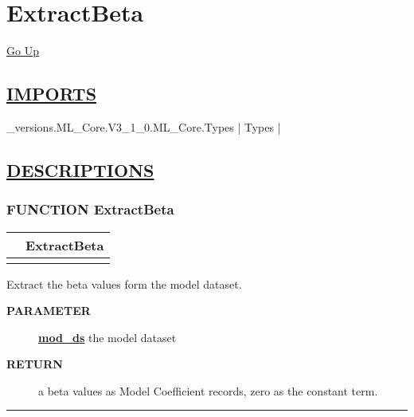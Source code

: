 \chapter*{\color{headfile}
ExtractBeta
}
\hypertarget{ecldoc:toc:ExtractBeta}{}
\hyperlink{ecldoc:toc:root}{Go Up}

\section*{\underline{\textsf{IMPORTS}}}
\begin{doublespace}
{\large
\_versions.ML\_Core.V3\_1\_0.ML\_Core.Types |
Types |
}
\end{doublespace}

\section*{\underline{\textsf{DESCRIPTIONS}}}
\subsection*{\textsf{\colorbox{headtoc}{\color{white} FUNCTION}
ExtractBeta}}

\hypertarget{ecldoc:extractbeta}{}

{\renewcommand{\arraystretch}{1.5}
\begin{tabularx}{\textwidth}{|>{\raggedright\arraybackslash}l|X|}
\hline
\hspace{0pt}\mytexttt{\color{red} } & \textbf{ExtractBeta} \\
\hline
\multicolumn{2}{|>{\raggedright\arraybackslash}X|}{\hspace{0pt}\mytexttt{\color{param} (DATASET(Core\_Types.Layout\_Model) mod\_ds)}} \\
\hline
\end{tabularx}
}

\par
Extract the beta values form the model dataset.

\par
\begin{description}
\item [\colorbox{tagtype}{\color{white} \textbf{\textsf{PARAMETER}}}] \textbf{\underline{mod\_ds}} the model dataset
\item [\colorbox{tagtype}{\color{white} \textbf{\textsf{RETURN}}}] \textbf{\underline{}} a beta values as Model Coefficient records, zero as the constant term.
\end{description}

\rule{\linewidth}{0.5pt}
